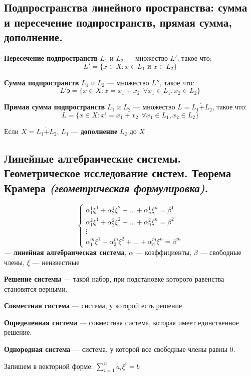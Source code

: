 \subsection{Подпространства линейного пространства: сумма и пересечение подпространств, прямая сумма, дополнение.}
\begin{definition}
    \textbf{Пересечение подпространств} $L_1$ и $L_2$ --- множество $L'$, такое что: $$L'=\{x\in X : x\in L_1 \text{ и } x\in L_2\}$$
\end{definition}
\begin{definition}
    \textbf{Сумма подпространств} $L_1$ и $L_2$ --- множество $L''$, такое что: $$L'э=\{x\in X : x=x_1+x_2 \ \ \forall x_1 \in L_1, x_2 \in L_2\}$$
\end{definition}
\begin{definition}
    \textbf{Прямая сумма подпространств} $L_1$ и $L_2$ --- множество $L=L_1\dot+L_2$, такое что: $$L=\{x\in X : x!=x_1+x_2 \ \ \forall x_1 \in L_1, x_2 \in L_2\}$$
\end{definition}
\begin{definition}
    Если $X=L_1\dot+L_2$, $L_1$ --- \textbf{дополнение} $L_2$ до $X$
\end{definition}
\subsection{Линейные алгебраические системы. Геометрическое исследование систем. Теорема Крамера \textit{(геометрическая формулировка)}.}
\begin{definition}
    $$\begin{cases}
        \alpha_1^1\xi^1+\alpha_2^1\xi^2+\ldots+\alpha_n^1\xi^n=\beta^1 \\
        \alpha_1^2\xi^1+\alpha_2^2\xi^2+\ldots+\alpha_n^2\xi^n=\beta^2 \\
        \vdots \\
        \alpha_1^m\xi^1+\alpha_2^m\xi^2+\ldots+\alpha_n^m\xi^n=\beta^m
    \end{cases}$$ --- \textbf{линейная алгебраическая система}, $\alpha$ --- коэффициенты, $\beta$ --- свободные члены, $\xi$ --- неизвестные
\end{definition}
\begin{definition}
    \textbf{Решение системы} --- такой набор, при подстановке которого равенства становятся верными.
\end{definition}
\begin{definition}
    \textbf{Совместная система} --- система, у которой есть решение.
\end{definition}
\begin{definition}
    \textbf{Определенная система} --- совместная система, которая имеет единственное решение.
\end{definition}
\begin{definition}
    \textbf{Однородная система} --- система, у которой все свободные члены равны $0$.
\end{definition}
Запишем в векторной форме: $\sum\limits_{i=1}^n a_i\xi^i=b$

